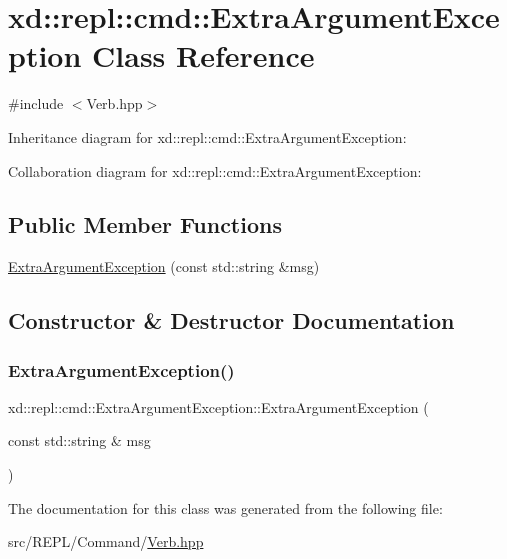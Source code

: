 \hypertarget{classxd_1_1repl_1_1cmd_1_1_extra_argument_exception}{}\section{xd\+:\+:repl\+:\+:cmd\+:\+:Extra\+Argument\+Exception Class Reference}
\label{classxd_1_1repl_1_1cmd_1_1_extra_argument_exception}


{\ttfamily \#include $<$Verb.\+hpp$>$}



Inheritance diagram for xd\+:\+:repl\+:\+:cmd\+:\+:Extra\+Argument\+Exception\+:


Collaboration diagram for xd\+:\+:repl\+:\+:cmd\+:\+:Extra\+Argument\+Exception\+:
\subsection*{Public Member Functions}
\begin{DoxyCompactItemize}
\item 
\mbox{\hyperlink{classxd_1_1repl_1_1cmd_1_1_extra_argument_exception_a09173f6c8356fed11e6c26e67c02beeb}{Extra\+Argument\+Exception}} (const std\+::string \&msg)
\end{DoxyCompactItemize}


\subsection{Constructor \& Destructor Documentation}
\mbox{\label{classxd_1_1repl_1_1cmd_1_1_extra_argument_exception_a09173f6c8356fed11e6c26e67c02beeb}} 
\subsubsection{\texorpdfstring{Extra\+Argument\+Exception()}{ExtraArgumentException()}}
{\footnotesize\ttfamily xd\+::repl\+::cmd\+::\+Extra\+Argument\+Exception\+::\+Extra\+Argument\+Exception (\begin{DoxyParamCaption}\item[{const std\+::string \&}]{msg }\end{DoxyParamCaption})\hspace{0.3cm}{\ttfamily [inline]}}



The documentation for this class was generated from the following file\+:\begin{DoxyCompactItemize}
\item 
src/\+R\+E\+P\+L/\+Command/\mbox{\hyperlink{_verb_8hpp}{Verb.\+hpp}}\end{DoxyCompactItemize}
